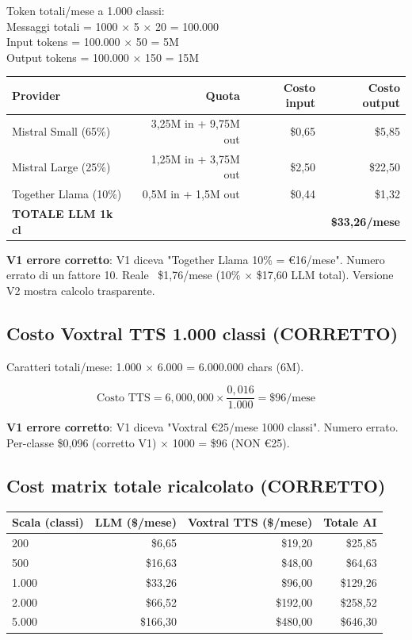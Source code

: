 \documentclass[12pt,a4paper]{article}
\begin{document}
Token totali/mese a 1.000 classi: \\
Messaggi totali = 1000 × 5 × 20 = 100.000 \\
Input tokens = 100.000 × 50 = 5M \\
Output tokens = 100.000 × 150 = 15M

\begin{center}
\begin{tabular}{lrrr}
\toprule
\textbf{Provider} & \textbf{Quota} & \textbf{Costo input} & \textbf{Costo output} \\
\midrule
Mistral Small (65\%)  & 3,25M in + 9,75M out & \$0,65 & \$5,85 \\
Mistral Large (25\%)  & 1,25M in + 3,75M out & \$2,50 & \$22,50 \\
Together Llama (10\%) & 0,5M in + 1,5M out   & \$0,44 & \$1,32 \\
\textbf{TOTALE LLM 1k cl} & & & \textbf{\$33,26/mese} \\
\bottomrule
\end{tabular}
\end{center}

\textbf{V1 errore corretto}: V1 diceva "Together Llama 10\% = €16/mese". Numero errato di un fattore 10. Reale ~\$1,76/mese (10\% × \$17,60 LLM total). Versione V2 mostra calcolo trasparente.

\subsection*{Costo Voxtral TTS 1.000 classi (CORRETTO)}

Caratteri totali/mese: 1.000 × 6.000 = 6.000.000 chars (6M).

\begin{equation*}
\text{Costo TTS} = 6{,}000{,}000 \times \frac{0{,}016}{1.000} = \$96/\text{mese}
\end{equation*}

\textbf{V1 errore corretto}: V1 diceva "Voxtral €25/mese 1000 classi". Numero errato. Per-classe \$0,096 (corretto V1) × 1000 = \$96 (NON €25).

\subsection*{Cost matrix totale ricalcolato (CORRETTO)}

\begin{center}
\begin{tabular}{lrrr}
\toprule
\textbf{Scala (classi)} & \textbf{LLM (\$/mese)} & \textbf{Voxtral TTS (\$/mese)} & \textbf{Totale AI} \\
\midrule
200    & \$6,65    & \$19,20    & \$25,85   \\
500    & \$16,63   & \$48,00    & \$64,63   \\
1.000  & \$33,26   & \$96,00    & \$129,26  \\
2.000  & \$66,52   & \$192,00   & \$258,52  \\
5.000  & \$166,30  & \$480,00   & \$646,30  \\
\bottomrule
\end{tabular}
\end{center}
\end{document}
